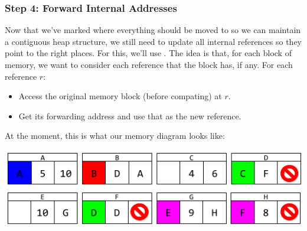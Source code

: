 \documentclass[letterpaper]{article}
\begin{document}
\subsubsection{Step 4: Forward Internal Addresses}
\begin{mdframed}
    Now that we've marked where everything should be moved to so we can maintain a contiguous heap structure, we still need to update all internal references so they point to the right places. For this, we'll use . The idea is that, for each block of memory, we want to consider each reference that the block has, if any. For each reference $r$: 
    \begin{itemize}
        \item Access the original memory block (before compating) at $r$.
        \item Get its forwarding address and use that as the new reference.
    \end{itemize}
\end{mdframed}
At the moment, this is what our memory diagram looks like: 
\begin{center}
    \includegraphics[scale=0.5]{../assets/GCAlg4.png}
\end{center}
\end{document}
